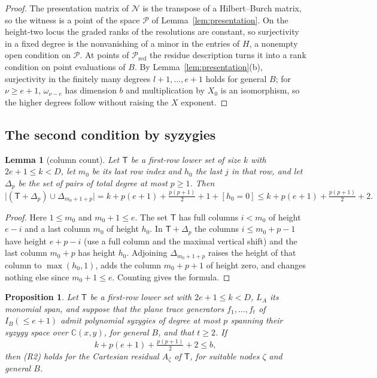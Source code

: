 \documentclass{amsart}
\newtheorem{proposition}[theorem]{Proposition}
\newtheorem{lemma}[theorem]{Lemma}
\theoremstyle{definition}
\theoremstyle{remark}
\numberwithin{equation}{section}
\newcommand{\CC}{\mathbb{C}}
\begin{document}
\begin{proof}
The presentation matrix of $\mathcal N$ is the transpose of a Hilbert--Burch matrix,
so the witness is a point of the space $\mathcal P$ of Lemma~\ref{lem:presentation}. On
the height-two locus the graded ranks of the resolutions are constant, so surjectivity in a
fixed degree is the nonvanishing of a minor in the entries of $H$, a nonempty open condition
on $\mathcal P$. At points of $\mathcal P_{\mathrm{red}}$ the residue description turns it
into a rank condition on point evaluations of $B$. By Lemma~\ref{lem:presentation}(b),
surjectivity in the finitely many degrees $l+1,\dots,e+1$ holds for general $B$; for $\nu\ge e+1$, $\omega_{\nu-e}$ has dimension $b$ and multiplication by $X_0$ is an
isomorphism, so the higher degrees follow without raising the $X$ exponent.
\end{proof}

\subsection{The second condition by syzygies}
\begin{lemma}[column count]\label{lem:columns}
Let $\mathsf T$ be a first-row lower set of size $k$ with $2e+1\le k<D$, let $m_0$ be its
last row index and $h_0$ the last $j$ in that row, and let $\Delta_p$ be the set of pairs of
total degree at most $p\ge1$. Then
\[
  \bigl|(\mathsf T+\Delta_p)\cup\Delta_{m_0+1+p}\bigr|=k+p(e+1)+\tfrac{p(p+1)}2+1+[h_0=0]
  \le k+p(e+1)+\tfrac{p(p+1)}2+2 .
\]
\end{lemma}

\begin{proof}
Here $1\le m_0$ and $m_0+1\le e$. The set $\mathsf T$ has full columns $i<m_0$ of height
$e-i$ and a last column $m_0$ of height $h_0$. In $\mathsf T+\Delta_p$ the columns
$i\le m_0+p-1$ have height $e+p-i$ (use a full column and the maximal vertical shift)
and the last column $m_0+p$ has height $h_0$. Adjoining $\Delta_{m_0+1+p}$ raises the
height of that column to $\max(h_0,1)$, adds the column $m_0+p+1$ of height zero, and
changes nothing else since $m_0+1\le e$. Counting gives the formula.
\end{proof}

\begin{proposition}\label{prop:R2syz}
Let $\mathsf T$ be a first-row lower set with $2e+1\le k<D$, $L_A$ its monomial span, and
suppose that the plane trace generators $f_1,\dots,f_t$ of $I_B(\le e+1)$ admit
polynomial syzygies of degree at most $p$ spanning their syzygy space over
$\CC(x,y)$, for general $B$, and that $t\ge2$. If
\begin{equation}\label{eq:R2dim}
  k+p(e+1)+\tfrac{p(p+1)}2+2\le b,
\end{equation}
then (R2) holds for the Cartesian residual $A_\zeta$ of $\mathsf T$, for suitable nodes
$\zeta$ and general $B$.
\end{proposition}
\end{document}
